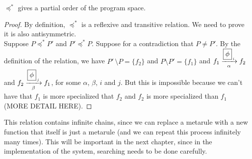 \begin{thm}
$\preccurlyeq^{*}$ gives a partial order of the program space.
\begin{proof}
By definition, $\preccurlyeq^{*}$ is a reflexive and transitive relation.
We need to prove it is also antisymmetric. \\
Suppose $P \preccurlyeq^{*} P'$ and $P' \preccurlyeq^{*} P$. Suppose for a contradiction that $P \neq P'$. By the definition of the relation, we have $P'\, \setminus P = \{f_{2}\}$ and  $P \setminus P' = \{f_{1}\}$ and $f_{1} \xrightarrow[\alpha]{\fbox{$\phi$}_{\,i}} f_{2}$ and $f_{2} \xrightarrow[\beta]{\fbox{$\phi$}_{\,j}} f_{1}$, for some $\alpha$, $\beta$, $i$ and $j$. But this is impossible because we can't have that $f_{1}$ is more specialized that $f_{2}$ and $f_{2}$ is more specialized than $f_{1}$ (\textsc{MORE DETAIL HERE}).
\end{proof}
\end{thm}

\noindent This relation contains infinite chains, since we can replace a metarule with a new function that itself is just a metarule (and we can repeat this process infinitely many times). This will be important in the next chapter, since in the implementation of the system, searching needs to be done carefully.
\fi